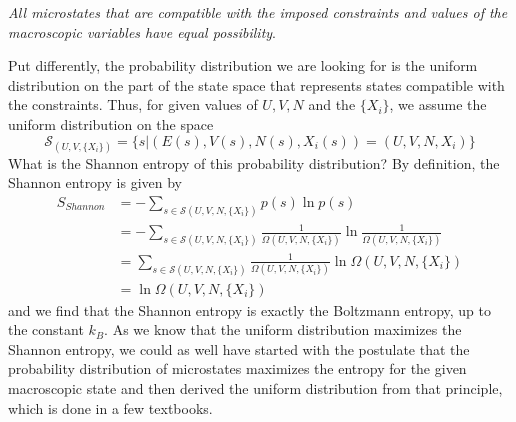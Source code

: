 \documentclass[a4paper, draft]{article}
\theoremstyle{own}
\theoremstyle{remark}
\begin{document}
{\em All microstates that are compatible with the imposed constraints and values of the macroscopic variables have equal possibility}. 

Put differently, the probability distribution we are looking for is the uniform distribution on the part of the state space that represents states compatible with the constraints. Thus, for given values of $U,V,N$ and the $\{ X_i\}$, we assume the uniform distribution on the space
$$
{\mathcal S}_{(U,V, \{ X_i\})} = \{ s | (E(s), V(s), N(s), X_i(s)) = (U,V,N,X_i)\}
$$
What is the Shannon entropy of this probability distribution? By definition, the Shannon entropy is given by
\begin{align*}
S_{Shannon} &= - \sum_{s \in {\mathcal S}(U,V,N, \{X_i\})} p(s) \ln p(s) \\
&= - \sum_{s \in {\mathcal S}(U,V,N, \{X_i\})} \frac{1}{\Omega(U,V,N, \{X_i\})} 
\ln \frac{1}{\Omega(U,V,N, \{X_i\})} \\
&= \sum_{s \in {\mathcal S}(U,V,N, \{X_i\})} \frac{1}{\Omega(U,V,N, \{X_i\})}  
\ln \Omega(U,V,N, \{X_i\}) \\& = \ln \Omega(U,V,N, \{X_i\}) 
\end{align*}
and we find that the Shannon entropy is exactly the Boltzmann entropy, up to the constant $k_B$. As we know that the uniform distribution maximizes the Shannon entropy, we could as well have started with the postulate that the probability distribution of microstates maximizes the entropy for the given macroscopic state and then derived the uniform distribution from that principle, which is done in a few textbooks.
\end{document}
